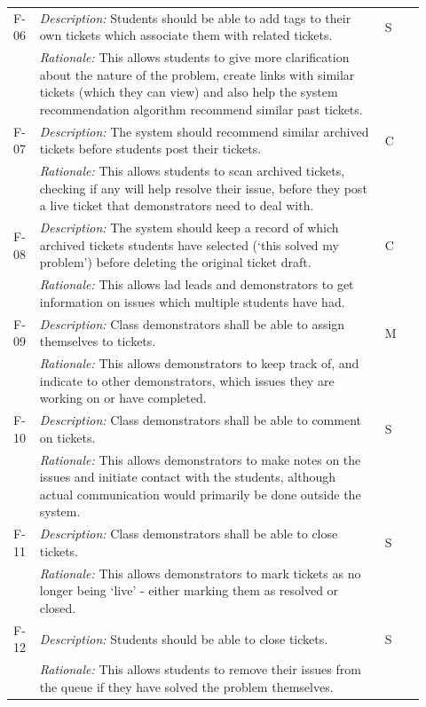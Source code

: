 \begin{table}[H]
\begin{tabular}{|p{0.05\linewidth} | p{0.78\linewidth} |p{0.09\linewidth}|}
  
 \hline\hline
 F-06 & \textit{Description:} Students should be able to add tags to their own tickets which associate them with related tickets. & S\\
  \cline{2-2}
  & \textit{Rationale:} This allows students to give more clarification about the nature of the problem, create links with similar tickets (which they can view) and also help the system recommendation algorithm recommend similar past tickets. & \\

  
    \hline\hline
 F-07 & \textit{Description:} The system should recommend similar archived tickets before students post their tickets. & C\\
  \cline{2-2}
  & \textit{Rationale:} This allows students to scan archived tickets, checking if any will help resolve their issue, before they post a live ticket that demonstrators need to deal with. & \\
  
      \hline\hline
 F-08 & \textit{Description:} The system should keep a record of which archived tickets students have selected (`this solved my problem') before deleting the original ticket draft. & C\\
  \cline{2-2}
  & \textit{Rationale:} This allows lad leads and demonstrators to get information on issues which multiple students have had. & \\
  
   \hline\hline
 F-09 & \textit{Description:} Class demonstrators shall be able to assign themselves to tickets. & M\\
  \cline{2-2}
  & \textit{Rationale:} This allows demonstrators to keep track of, and indicate to other demonstrators, which issues they are working on or have completed. & \\

  
  \hline\hline
 F-10 & \textit{Description:} Class demonstrators shall be able to comment on tickets. & S\\
  \cline{2-2}
  & \textit{Rationale:} This allows demonstrators to make notes on the issues and initiate contact with the students, although actual communication would primarily be done outside the system. & \\

    \hline\hline
 F-11 & \textit{Description:} Class demonstrators shall be able to close tickets. & S\\
  \cline{2-2}
  & \textit{Rationale:} This allows demonstrators to mark tickets as no longer being `live' - either marking them as resolved or closed. & \\

  
      \hline\hline
 F-12 & \textit{Description:} Students should be able to close tickets. & S\\
  \cline{2-2}
  & \textit{Rationale:} This allows students to remove their issues from the queue if they have solved the problem themselves. & \\
\hline



  \end{tabular}
\end{table}


